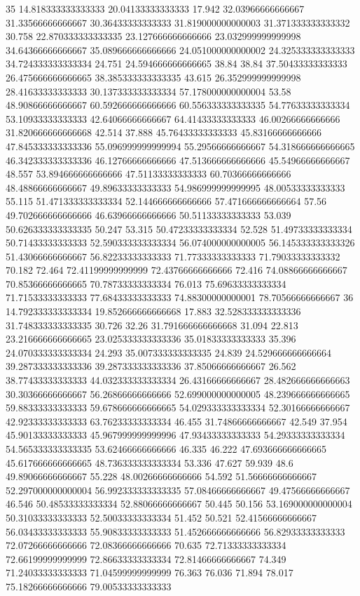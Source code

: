 35 14.818333333333333 20.04133333333333 17.942 32.03966666666667 31.33566666666667 30.36433333333333 31.819000000000003 31.371333333333332 30.758 22.870333333333335 23.127666666666666 23.032999999999998 34.64366666666667 35.089666666666666 24.051000000000002 24.325333333333333 34.724333333333334 24.751 24.594666666666665 38.84 38.84 37.50433333333333 26.475666666666665 38.385333333333335 43.615 26.352999999999998 28.41633333333333 30.137333333333334 57.178000000000004 53.58 48.90866666666667 60.592666666666666 60.556333333333335 54.77633333333334 53.10933333333333 42.64066666666667 64.41433333333333 46.00266666666666 31.820666666666668 42.514 37.888 45.76433333333333 45.83166666666666 47.845333333333336 55.096999999999994 55.29566666666667 54.318666666666665 46.342333333333336 46.12766666666666 47.513666666666666 45.54966666666667 48.557 53.894666666666666 47.51133333333333 60.70366666666666 48.48866666666667 49.89633333333333 54.986999999999995 48.00533333333333 55.115 51.471333333333334 52.144666666666666 57.471666666666664 57.56 49.702666666666666 46.63966666666666 50.51133333333333 53.039 50.626333333333335 50.247 53.315 50.47233333333334 52.528 51.49733333333334 50.71433333333333 52.590333333333334 56.074000000000005 56.145333333333326 51.43066666666667 56.82233333333333 71.77333333333333 71.79033333333332 70.182 72.464 72.41199999999999 72.43766666666666 72.416 74.08866666666667 70.85366666666665 70.78733333333334 76.013 75.69633333333334 71.71533333333333 77.68433333333333 74.88300000000001 78.70566666666667
36 14.792333333333334 19.852666666666668 17.883 32.528333333333336 31.748333333333335 30.726 32.26 31.791666666666668 31.094 22.813 23.216666666666665 23.025333333333336 35.01833333333333 35.396 24.070333333333334 24.293 35.007333333333335 24.839 24.529666666666664 39.287333333333336 39.287333333333336 37.85066666666667 26.562 38.77433333333333 44.032333333333334 26.43166666666667 28.482666666666663 30.30366666666667 56.26866666666666 52.699000000000005 48.239666666666665 59.88333333333333 59.678666666666665 54.029333333333334 52.30166666666667 42.92333333333333 63.76233333333334 46.455 31.74866666666667 42.549 37.954 45.90133333333333 45.967999999999996 47.93433333333333 54.29333333333334 54.565333333333335 53.62466666666666 46.335 46.222 47.693666666666665 45.617666666666665 48.736333333333334 53.336 47.627 59.939 48.6 49.89066666666667 55.228 48.00266666666666 54.592 51.56666666666667 52.297000000000004 56.992333333333335 57.08466666666667 49.47566666666667 46.546 50.48533333333334 52.88066666666667 50.445 50.156 53.169000000000004 50.31033333333333 52.50033333333334 51.452 50.521 52.41566666666667 56.03433333333333 55.90833333333333 51.452666666666666 56.82933333333333 72.07266666666666 72.08366666666666 70.635 72.71333333333334 72.66199999999999 72.86633333333334 72.81466666666667 74.349 71.24033333333333 71.04599999999999 76.363 76.036 71.894 78.017 75.18266666666666 79.00533333333333
